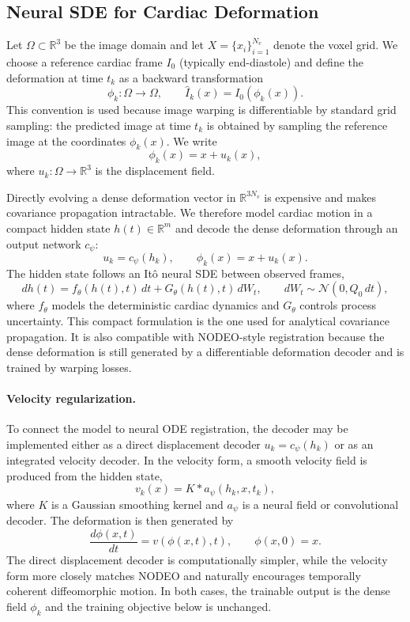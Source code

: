 
\subsection{Neural SDE for Cardiac Deformation}
\label{sec:neural_sde_deformation}

Let $\Omega \subset \mathbb{R}^{3}$ be the image domain and let
$X=\{x_i\}_{i=1}^{N_v}$ denote the voxel grid. We choose a reference
cardiac frame $I_0$ (typically end-diastole) and define the deformation
at time $t_k$ as a backward transformation
\[
    \phi_k : \Omega \rightarrow \Omega,
    \qquad
    \widehat I_k(x) = I_0(\phi_k(x)).
\]
This convention is used because image warping is differentiable by
standard grid sampling: the predicted image at time $t_k$ is obtained by
sampling the reference image at the coordinates $\phi_k(x)$. We write
\[
    \phi_k(x) = x + u_k(x),
\]
where $u_k:\Omega\rightarrow\mathbb{R}^3$ is the displacement field.

Directly evolving a dense deformation vector in
$\mathbb{R}^{3N_v}$ is expensive and makes covariance propagation
intractable. We therefore model cardiac motion in a compact hidden state
$h(t)\in\mathbb{R}^{m}$ and decode the dense deformation through an
output network $c_\psi$:
\[
    u_k = c_\psi(h_k), \qquad \phi_k(x)=x+u_k(x).
\]
The hidden state follows an Itô neural SDE between observed frames,
\[
    dh(t) = f_\theta(h(t),t)\,dt
          + G_\theta(h(t),t)\,dW_t ,
    \qquad dW_t\sim\mathcal{N}(0,Q_0\,dt),
\]
where $f_\theta$ models the deterministic cardiac dynamics and
$G_\theta$ controls process uncertainty. This compact formulation is the
one used for analytical covariance propagation. It is also compatible
with NODEO-style registration because the dense deformation is still
generated by a differentiable deformation decoder and is trained by
warping losses.

\paragraph{Velocity regularization.}
To connect the model to neural ODE registration, the decoder may be
implemented either as a direct displacement decoder $u_k=c_\psi(h_k)$
or as an integrated velocity decoder. In the velocity form, a smooth
velocity field is produced from the hidden state,
\[
    v_k(x) = K * a_\psi(h_k,x,t_k),
\]
where $K$ is a Gaussian smoothing kernel and $a_\psi$ is a neural field
or convolutional decoder. The deformation is then generated by
\[
    \frac{d\phi(x,t)}{dt}=v(\phi(x,t),t), \qquad \phi(x,0)=x.
\]
The direct displacement decoder is computationally simpler, while the
velocity form more closely matches NODEO and naturally encourages
temporally coherent diffeomorphic motion. In both cases, the trainable
output is the dense field $\phi_k$ and the training objective below is
unchanged.

